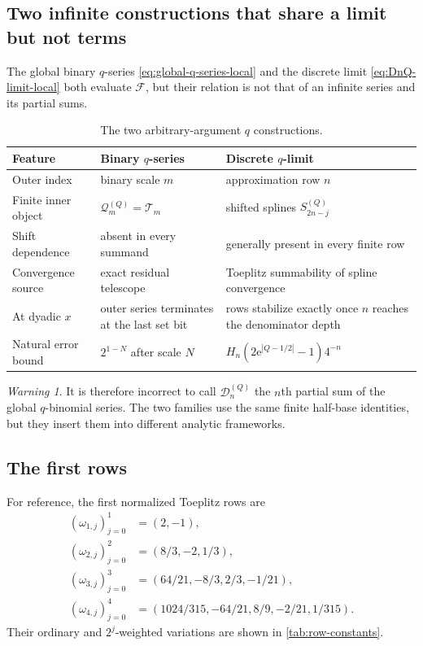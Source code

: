 \documentclass[11pt,oneside]{article}
\theoremstyle{definition}
\theoremstyle{remark}
\newtheorem{warning}[theorem]{Warning}
\newcommand{\e}{\mathrm e}
\begin{document}
\subsection{Two infinite constructions that share a limit but not terms}

The global binary $q$-series \eqref{eq:global-q-series-local} and the discrete limit
\eqref{eq:DnQ-limit-local} both evaluate $\mathcal F$, but their relation is not that of an
infinite series and its partial sums.

\begin{table}[ht]
\centering
\small
\begin{tabularx}{\textwidth}{@{}p{}XX@{}}
\toprule
Feature & Binary $q$-series & Discrete $q$-limit \\
\midrule
Outer index & binary scale $m$ & approximation row $n$ \\
Finite inner object & $\mathcal Q_m^{(Q)}=\mathcal T_m$ & shifted splines $S_{2n-j}^{(Q)}$ \\
Shift dependence & absent in every summand & generally present in every finite row \\
Convergence source & exact residual telescope & Toeplitz summability of spline convergence \\
At dyadic $x$ & outer series terminates at the last set bit & rows stabilize exactly once $n$ reaches the denominator depth \\
Natural error bound & $2^{1-N}$ after scale $N$ & $H_n(2\e^{|Q-1/2|}-1)4^{-n}$ \\
\bottomrule
\end{tabularx}
\caption{The two arbitrary-argument $q$ constructions.}
\label{tab:two-infinite}
\end{table}

\begin{warning}
It is therefore incorrect to call $\mathcal D_n^{(Q)}$ the $n$th partial sum of the global
$q$-binomial series.  The two families use the same finite half-base identities, but they
insert them into different analytic frameworks.
\end{warning}

\subsection{The first rows}

For reference, the first normalized Toeplitz rows are
\begin{align*}
 (\omega_{1,j})_{j=0}^{1}&=(2,-1),\\
 (\omega_{2,j})_{j=0}^{2}&=(8/3,-2,1/3),\\
 (\omega_{3,j})_{j=0}^{3}&=(64/21,-8/3,2/3,-1/21),\\
 (\omega_{4,j})_{j=0}^{4}&=(1024/315,-64/21,8/9,-2/21,1/315).
\end{align*}
Their ordinary and $2^j$-weighted variations are shown in
\cref{tab:row-constants}.
\end{document}
